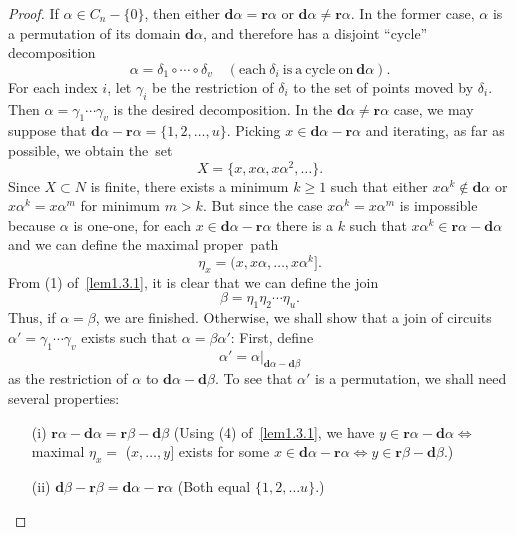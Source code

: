 \documentclass{surv-l}
\numberwithin{equation}{section}
\numberwithin{table}{section}
\numberwithin{figure}{section}
\theoremstyle{definition}
\begin{document}
\begin{proof} If $\alpha\in C_{n}-\{0\}$, then either
$\mathbf{d}\alpha=\mathbf{r}\alpha$ or $\mathbf{d}\alpha\neq
\mathbf{r}\alpha$. In the former case, $\alpha$ is a
permutation of its domain $\mathbf{d}\alpha$, and
therefore has a disjoint ``cycle'' decomposition
\[
\alpha=\delta_{1}\circ\cdots \circ\delta_{v}\quad (\mathrm{each}\ \delta_{i}\ \mathrm{is\ a\
cycle\ on}\ \mathbf{d}\alpha).
\]
For each index $i$, let $\gamma_{i}$ be the restriction of
$\delta_{i}$ to the set of points moved by $\delta_{i}$. Then
$\alpha=\gamma_{1}\cdots\gamma_{v}$ is the desired decomposition.
In the $\mathbf{d}\alpha\neq \mathbf{r}\alpha$ case, we may
suppose that $\mathbf{d}\alpha-\mathbf{r}\alpha=\{1,2,\ldots,
u\}$. Picking $x\in \mathbf{d}\alpha-\mathbf{r}\alpha$ and
iterating, as far as possible, we obtain the~set
\[
X=\{x,x\alpha,x\alpha^{2},\ldots\}.
\]
Since $X\subset N$ is finite, there exists a minimum $k\geq 1$
such that either $x\alpha^{k}\not\in \mathbf{d}\alpha$ or
$x\alpha^{k}=x\alpha^{m}$ for minimum $m>k$. But since the case
$x\alpha^{k}=x\alpha^{m}$ is impossible because $\alpha$ is
one-one, for each $ x\in \mathbf{d}\alpha-\mathbf{r}\alpha$ there
is a $k$ such that $x\alpha^{k}\in
\mathbf{r}\alpha-\mathbf{d}\alpha$ and we can define the maximal
proper~path
\[
\eta_{x}=(x, x\alpha,\ldots, x\alpha^{k}].
\]
From (1) of~\ref{lem1.3.1}, it is clear that we can define the
join
\[
\beta=\eta_{1}\eta_{2}\cdots\eta_{u}.
\]
Thus, if $\alpha=\beta$, we are finished. Otherwise, we shall
show that a join of circuits
$\alpha'=\gamma_{1}\cdots\gamma_{v}$ exists such that
$\alpha=\beta\alpha'$: First, define
\[
\alpha'=\alpha|_{\mathbf{d}\alpha-\mathbf{d}\beta}
\]
as the restriction of $\alpha$ to
$\mathbf{d}\alpha-\mathbf{d}\beta$. To see that $\alpha'$ is a
permutation, we shall need several properties:
\begin{enumerate}
\item[(i)] $\mathbf{r}\alpha-\mathbf{d}\alpha=\mathbf{r}\beta-\mathbf{d}\beta$
(Using (4) of~\ref{lem1.3.1}, we have $ y\in
\mathbf{r}\alpha-\mathbf{d}\alpha\Leftrightarrow$ maximal
$\eta_{x}=$ ($x,\ldots, y]$ exists for some $x\in
\mathbf{d}\alpha-\mathbf{r}\alpha\Leftrightarrow y\in
\mathbf{r}\beta-\mathbf{d}\beta.$)

\item[(ii)] $\mathbf{d}\beta-\mathbf{r}\beta=\mathbf{d}\alpha-\mathbf{r}\alpha$
(Both equal $\{1,2,\ldots u\}.$)


\end{enumerate}
\end{proof}
\end{document}
